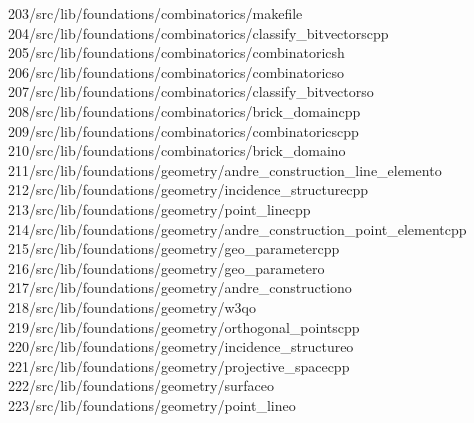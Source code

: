 \begin{tabbing}
203\>/src/lib/foundations/combinatorics/makefile\\[0pt]
204\>/src/lib/foundations/combinatorics/classify\_bitvectorscpp\\[0pt]
205\>/src/lib/foundations/combinatorics/combinatoricsh\\[0pt]
206\>/src/lib/foundations/combinatorics/combinatoricso\\[0pt]
207\>/src/lib/foundations/combinatorics/classify\_bitvectorso\\[0pt]
208\>/src/lib/foundations/combinatorics/brick\_domaincpp\\[0pt]
209\>/src/lib/foundations/combinatorics/combinatoricscpp\\[0pt]
210\>/src/lib/foundations/combinatorics/brick\_domaino\\[0pt]
211\>/src/lib/foundations/geometry/andre\_construction\_line\_elemento\\[0pt]
212\>/src/lib/foundations/geometry/incidence\_structurecpp\\[0pt]
213\>/src/lib/foundations/geometry/point\_linecpp\\[0pt]
214\>/src/lib/foundations/geometry/andre\_construction\_point\_elementcpp\\[0pt]
215\>/src/lib/foundations/geometry/geo\_parametercpp\\[0pt]
216\>/src/lib/foundations/geometry/geo\_parametero\\[0pt]
217\>/src/lib/foundations/geometry/andre\_constructiono\\[0pt]
218\>/src/lib/foundations/geometry/w3qo\\[0pt]
219\>/src/lib/foundations/geometry/orthogonal\_pointscpp\\[0pt]
220\>/src/lib/foundations/geometry/incidence\_structureo\\[0pt]
221\>/src/lib/foundations/geometry/projective\_spacecpp\\[0pt]
222\>/src/lib/foundations/geometry/surfaceo\\[0pt]
223\>/src/lib/foundations/geometry/point\_lineo\\[0pt]

\end{tabbing}
